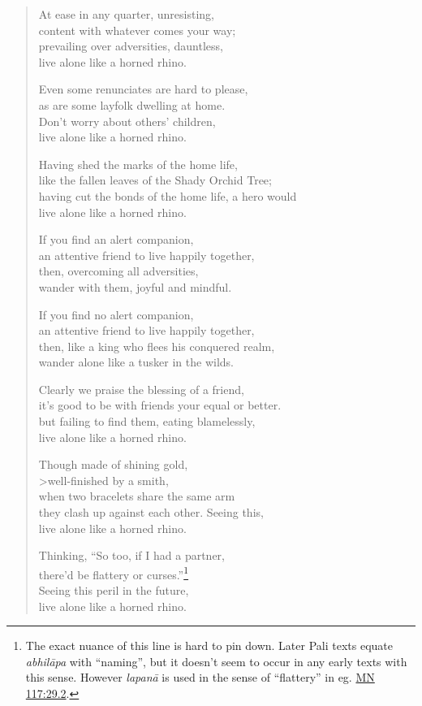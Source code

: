 \documentclass[12pt,openany]{book}%
\begin{document}
\begin{verse}
At ease in any quarter, unresisting, \\
content with whatever comes your way; \\
prevailing over adversities, dauntless, \\
live alone like a horned rhino. 

Even some renunciates are hard to please, \\
as are some layfolk dwelling at home. \\
Don’t worry about others’ children, \\
live alone like a horned rhino. 

Having shed the marks of the home life, \\
like the fallen leaves of the Shady Orchid Tree; \\
having cut the bonds of the home life, a hero would \\
live alone like a horned rhino. 

If you find an alert companion, \\
an attentive friend to live happily together, \\
then, overcoming all adversities, \\
wander with them, joyful and mindful. 

If you find no alert companion, \\
an attentive friend to live happily together, \\
then, like a king who flees his conquered realm, \\
wander alone like a tusker in the wilds. 

Clearly we praise the blessing of a friend, \\
it’s good to be with friends your equal or better. \\
but failing to find them, eating blamelessly, \\
live alone like a horned rhino. 

Though made of shining gold, \\>well-finished by a smith, \\
when two bracelets share the same arm \\
they clash up against each other. Seeing this, \\
live alone like a horned rhino. 

Thinking, “So too, if I had a partner, \\
there’d be flattery or curses.”\footnote{The exact nuance of this line is hard to pin down. Later Pali texts equate \textit{\textsanskrit{abhilāpa}} with “naming”, but it doesn’t seem to occur in any early texts with this sense. However \textit{\textsanskrit{lapanā}} is used in the sense of “flattery” in eg. \href{https://suttacentral.net/mn117/en/sujato\#29.2}{MN 117:29.2}. } \\
Seeing this peril in the future, \\
live alone like a horned rhino. 


\end{verse}
\end{document}
